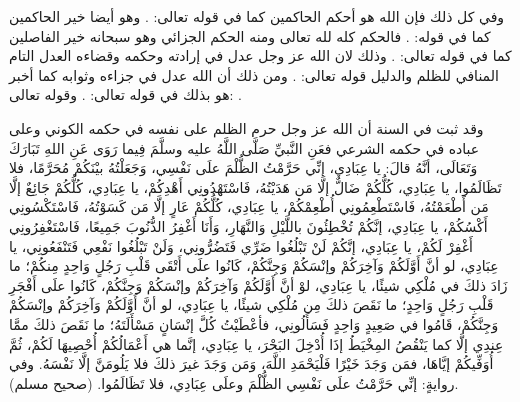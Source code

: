 وفي كل ذلك فإن الله هو أحكم الحاكمين كما في قوله تعالى:
\quranayah*[95][8]{\footnotesize \surahname*[95]}.
وهو أيضا خير الحاكمين كما في قوله:
\quranayah*[10][109]{\footnotesize \surahname*[10]}.
فالحكم كله لله تعالى ومنه الحكم الجزائي وهو سبحانه خير الفاصلين كما في قوله تعالى:
\quranayah*[6][57][14]{\footnotesize \surahname*[6]}. وذلك لان الله عز وجل عدل في إرادته وحكمه وقضاءه العدل التام المنافي للظلم والدليل قوله تعالى:
\quranayah*[3][108]{\footnotesize \surahname*[3]}. ومن ذلك أن الله عدل في جزاءه وثوابه كما أخبر هو بذلك في قوله تعالى:
\quranayah*[39][69]{\footnotesize \surahname*[69]}. وقوله تعالى:
\quranayah*[10][47]{\footnotesize \surahname*[10]}.

وقد ثبت في السنة أن الله عز وجل حرم الظلم على نفسه في حكمه الكوني وعلى عباده في حكمه الشرعي فعَنِ النَّبيِّ صَلَّى اللَّهُ عليه وسلَّمَ فِيما رَوَى عَنِ اللهِ تَبَارَكَ وَتَعَالَى، أنَّهُ قالَ: يا عِبَادِي، إنِّي حَرَّمْتُ الظُّلْمَ علَى نَفْسِي، وَجَعَلْتُهُ بيْنَكُمْ مُحَرَّمًا، فلا تَظَالَمُوا، يا عِبَادِي، كُلُّكُمْ ضَالٌّ إلَّا مَن هَدَيْتُهُ، فَاسْتَهْدُونِي أَهْدِكُمْ، يا عِبَادِي، كُلُّكُمْ جَائِعٌ إلَّا مَن أَطْعَمْتُهُ، فَاسْتَطْعِمُونِي أُطْعِمْكُمْ، يا عِبَادِي، كُلُّكُمْ عَارٍ إلَّا مَن كَسَوْتُهُ، فَاسْتَكْسُونِي أَكْسُكُمْ، يا عِبَادِي، إنَّكُمْ تُخْطِئُونَ باللَّيْلِ وَالنَّهَارِ، وَأَنَا أَغْفِرُ الذُّنُوبَ جَمِيعًا، فَاسْتَغْفِرُونِي أَغْفِرْ لَكُمْ، يا عِبَادِي، إنَّكُمْ لَنْ تَبْلُغُوا ضَرِّي فَتَضُرُّونِي، وَلَنْ تَبْلُغُوا نَفْعِي فَتَنْفَعُونِي، يا عِبَادِي، لو أنَّ أَوَّلَكُمْ وَآخِرَكُمْ وإنْسَكُمْ وَجِنَّكُمْ، كَانُوا علَى أَتْقَى قَلْبِ رَجُلٍ وَاحِدٍ مِنكُمْ؛ ما زَادَ ذلكَ في مُلْكِي شيئًا، يا عِبَادِي، لوْ أنَّ أَوَّلَكُمْ وَآخِرَكُمْ وإنْسَكُمْ وَجِنَّكُمْ، كَانُوا علَى أَفْجَرِ قَلْبِ رَجُلٍ وَاحِدٍ؛ ما نَقَصَ ذلكَ مِن مُلْكِي شيئًا، يا عِبَادِي، لو أنَّ أَوَّلَكُمْ وَآخِرَكُمْ وإنْسَكُمْ وَجِنَّكُمْ، قَامُوا في صَعِيدٍ وَاحِدٍ فَسَأَلُونِي، فأعْطَيْتُ كُلَّ إنْسَانٍ مَسْأَلَتَهُ؛ ما نَقَصَ ذلكَ ممَّا عِندِي إلَّا كما يَنْقُصُ المِخْيَطُ إذَا أُدْخِلَ البَحْرَ، يا عِبَادِي، إنَّما هي أَعْمَالُكُمْ أُحْصِيهَا لَكُمْ، ثُمَّ أُوَفِّيكُمْ إيَّاهَا، فمَن وَجَدَ خَيْرًا فَلْيَحْمَدِ اللَّهَ، وَمَن وَجَدَ غيرَ ذلكَ فلا يَلُومَنَّ إلَّا نَفْسَهُ. وفي روايةٍ: إنِّي حَرَّمْتُ علَى نَفْسِي الظُّلْمَ وعلَى عِبَادِي، فلا تَظَالَمُوا. {\footnotesize (صحيح مسلم)}.

